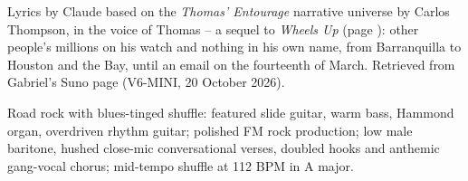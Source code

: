
\label{sec:line-of-credit}
\begin{notes}
Lyrics by Claude based on the \emph{Thomas' Entourage} narrative universe by Carlos Thompson, in the voice of Thomas -- a sequel to \emph{Wheels Up} (page \pageref{sec:wheels-up}): other people's millions on his watch and nothing in his own name, from Barranquilla to Houston and the Bay, until an email on the fourteenth of March. Retrieved from Gabriel's Suno page (V6-MINI, 20 October 2026).
\end{notes}
\begin{style}
Road rock with blues-tinged shuffle: featured slide guitar, warm bass, Hammond organ, overdriven rhythm guitar; polished FM rock production; low male baritone, hushed close-mic conversational verses, doubled hooks and anthemic gang-vocal chorus; mid-tempo shuffle at 112 BPM in A major.
\end{style}
